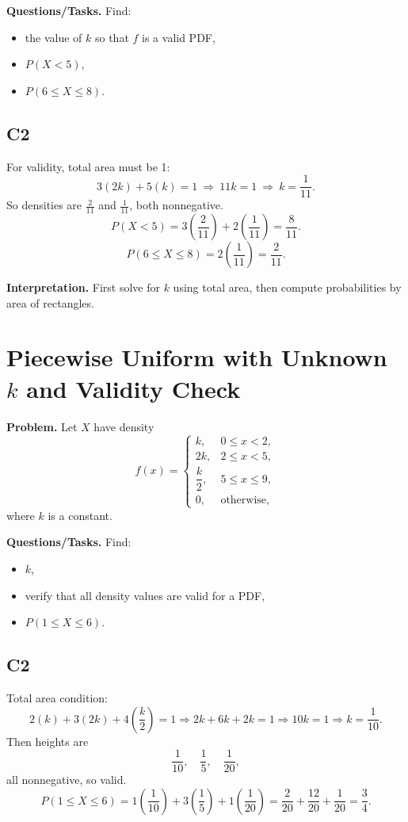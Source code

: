 \textbf{Questions/Tasks.}
Find:
\begin{itemize}
    \item[(a)] the value of $k$ so that $f$ is a valid PDF,
    \item[(b)] $P(X<5)$,
    \item[(c)] $P(6\le X\le 8)$.
\end{itemize}

\subsection*{C2}
For validity, total area must be 1:
\[
3(2k)+5(k)=1\ \Rightarrow\ 11k=1\ \Rightarrow\ k=\frac{1}{11}.
\]
So densities are $\frac{2}{11}$ and $\frac{1}{11}$, both nonnegative.
\[
P(X<5)=3\left(\frac{2}{11}\right)+2\left(\frac{1}{11}\right)=\frac{8}{11}.
\]
\[
P(6\le X\le 8)=2\left(\frac{1}{11}\right)=\frac{2}{11}.
\]

\textbf{Interpretation.}
First solve for $k$ using total area, then compute probabilities by area of rectangles.

\section{Piecewise Uniform with Unknown $k$ and Validity Check}

\textbf{Problem.}
Let $X$ have density
\[
f(x)=
\begin{cases}
k, & 0\le x<2,\\
2k, & 2\le x<5,\\
\dfrac{k}{2}, & 5\le x\le 9,\\
0, & \text{otherwise,}
\end{cases}
\]
where $k$ is a constant.

\textbf{Questions/Tasks.}
Find:
\begin{itemize}
    \item[(a)] $k$,
    \item[(b)] verify that all density values are valid for a PDF,
    \item[(c)] $P(1\le X\le 6)$.
\end{itemize}

\subsection*{C2}
Total area condition:
\[
2(k)+3(2k)+4\left(\frac{k}{2}\right)=1
\Rightarrow 2k+6k+2k=1
\Rightarrow 10k=1
\Rightarrow k=\frac{1}{10}.
\]
Then heights are
\[
\frac{1}{10},\quad \frac{1}{5},\quad \frac{1}{20},
\]
all nonnegative, so valid.
\[
P(1\le X\le 6)=1\left(\frac{1}{10}\right)+3\left(\frac{1}{5}\right)+1\left(\frac{1}{20}\right)
=\frac{2}{20}+\frac{12}{20}+\frac{1}{20}=\frac{3}{4}.
\]

